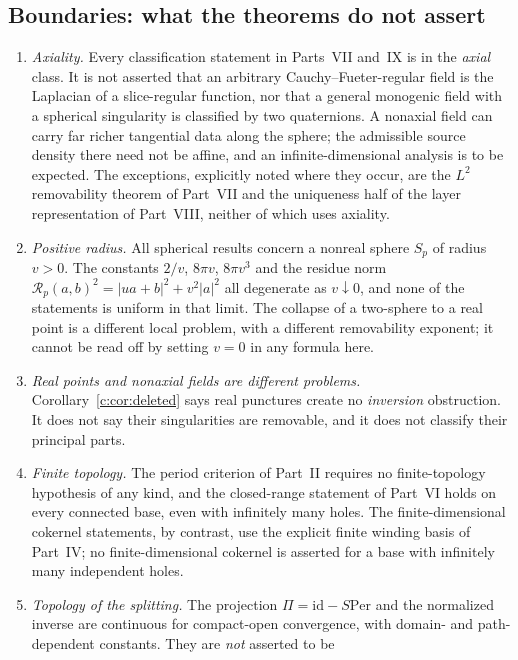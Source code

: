 \documentclass[11pt,a4paper]{article}
\numberwithin{equation}{section}
\theoremstyle{definition}
\theoremstyle{remark}
\theoremstyle{plain}
\newcommand{\Per}{\mathrm{Per}}
\newcommand{\Sp}{S_{p}}
\newcommand{\Rp}{\mathcal R_{p}}      %
\newcommand{\abs}[1]{\lvert #1\rvert}
\begin{document}
\subsection{Boundaries: what the theorems do not assert}
\label{f:sub:boundaries}

\begin{enumerate}[label=\textup{(B\arabic*)}]
\item \emph{Axiality.} Every classification statement in Parts~VII and~IX
is in the \emph{axial} class. It is not asserted that an arbitrary
Cauchy--Fueter-regular field is the Laplacian of a slice-regular function,
nor that a general monogenic field with a spherical singularity is
classified by two quaternions. A nonaxial field can carry far richer
tangential data along the sphere; the admissible source density there need
not be affine, and an infinite-dimensional analysis is to be expected. The
exceptions, explicitly noted where they occur, are the $L^2$ removability
theorem of Part~VII and the uniqueness half of the layer representation of
Part~VIII, neither of which uses axiality.
\item \emph{Positive radius.} All spherical results concern a nonreal
sphere $\Sp$ of radius $v>0$. The constants $2/v$, $8\pi v$, $8\pi v^3$ and
the residue norm $\Rp(a,b)^2=\abs{ua+b}^2+v^2\abs a^2$ all degenerate as
$v\downarrow0$, and none of the statements is uniform in that limit. The
collapse of a two-sphere to a real point is a different local problem, with
a different removability exponent; it cannot be read off by setting $v=0$
in any formula here.
\item \emph{Real points and nonaxial fields are different problems.}
Corollary~\ref{c:cor:deleted} says real punctures create no
\emph{inversion} obstruction. It does not say their singularities are
removable, and it does not classify their principal parts.
\item \emph{Finite topology.} The period criterion of Part~II requires no
finite-topology hypothesis of any kind, and the closed-range statement of
Part~VI holds on every connected base, even with infinitely many holes.
The finite-dimensional cokernel statements, by contrast, use the explicit
finite winding basis of Part~IV; no finite-dimensional cokernel is asserted
for a base with infinitely many independent holes.
\item \emph{Topology of the splitting.} The projection $\Pi=\mathrm{id}-S\Per$
and the normalized inverse are continuous for compact-open convergence, with
domain- and path-dependent constants. They are \emph{not} asserted to be

\end{enumerate}
\end{document}
